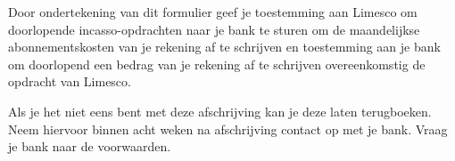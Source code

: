 \documentclass[a4paper,11pt]{memoir}
\begin{document}
\vspace{20mm}

Door ondertekening van dit formulier geef je toestemming aan Limesco om
doorlopende incasso-opdrachten naar je bank te sturen om de maandelijkse
abonnementskosten van je rekening af te schrijven en toestemming aan je bank om
doorlopend een bedrag van je rekening af te schrijven overeenkomstig de opdracht
van Limesco.

\vspace{10pt}

Als je het niet eens bent met deze afschrijving kan je deze laten terugboeken.
Neem hiervoor binnen acht weken na afschrijving contact op met je bank. Vraag je
bank naar de voorwaarden.
\end{document}
